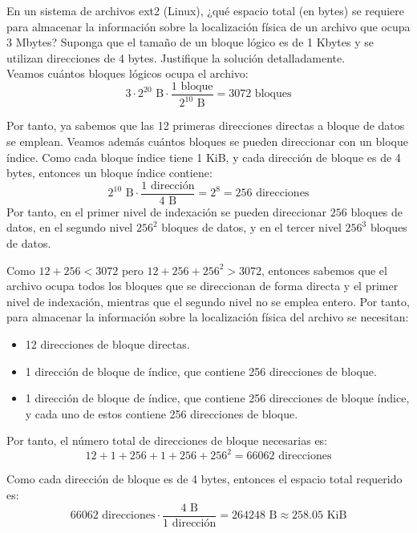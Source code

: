 \begin{ejercicio}
En un sistema de archivos ext2 (Linux), ¿qué espacio total (en bytes) se
requiere para almacenar la información sobre la localización física de un archivo
que ocupa 3 Mbytes? Suponga que el tamaño de un bloque lógico es de 1 Kbytes y se utilizan
direcciones de 4 bytes. Justifique la solución detalladamente.\\

    Veamos cuántos bloques lógicos ocupa el archivo:
    \begin{equation*}
        3\cdot 2^{20} \text{ B} \cdot \frac{1 \text{ bloque}}{2^{10} \text{ B}} = 3072 \text{ bloques}
    \end{equation*}

    Por tanto, ya sabemos que las 12 primeras direcciones directas a bloque de datos se emplean.
    Veamos además cuántos bloques se pueden direccionar con un bloque índice. Como
    cada bloque índice tiene 1 KiB, y cada dirección de bloque es de 4 bytes, entonces un bloque índice contiene:
    \begin{equation*}
        2^{10} \text{ B} \cdot \frac{1 \text{ dirección}}{4 \text{ B}}= 2^8=256 \text{ direcciones}
    \end{equation*}
    Por tanto, en el primer nivel de indexación se pueden direccionar $256$ bloques de datos,
    en el segundo nivel $256^2$ bloques de datos, y en el tercer nivel $256^3$ bloques de datos.

    Como $12+256<3072$ pero $12+256+256^2>3072$, entonces sabemos que el archivo ocupa todos los bloques
    que se direccionan de forma directa y el primer nivel de indexación, mientras que el segundo nivel
    no se emplea entero. Por tanto, para almacenar la información sobre la localización física del archivo
    se necesitan:
    \begin{itemize}
        \item 12 direcciones de bloque directas.
        \item 1 dirección de bloque de índice, que contiene 256 direcciones de bloque.
        \item 1 dirección de bloque de índice,
                que contiene 256 direcciones de bloque índice,
                y cada uno de estos contiene 256 direcciones de bloque.
    \end{itemize}

    Por tanto, el número total de direcciones de bloque necesarias es:
    \begin{equation*}
        12 + 1 + 256 + 1 + 256+ 256^2 = 66062 \text{ direcciones}
    \end{equation*}

    Como cada dirección de bloque es de 4 bytes, entonces el espacio total requerido es:
    \begin{equation*}
        66062 \text{ direcciones} \cdot \frac{4 \text{ B}}{1 \text{ dirección}} = 264248 \text{ B} \approx 258.05 \text{ KiB}
    \end{equation*}
\end{ejercicio}

